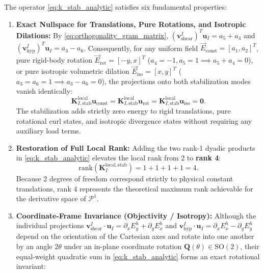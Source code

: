 \documentclass[VANCOUVER,Times1COL]{WileyNJD-v5}
\begin{document}
The operator \eqref{eq:k_stab_analytic} satisfies six fundamental properties:
\begin{enumerate}
    \item \textbf{Exact Nullspace for Translations, Pure Rotations, and Isotropic Dilations:} By \eqref{eq:orthogonality_gram_matrix}, $(\mathbf{v}_{\mathrm{shear}}^I)^T \mathbf{u}_I = a_5 + a_4$ and $(\mathbf{v}_{\mathrm{hyp}}^I)^T \mathbf{u}_I = a_3 - a_6$. Consequently, for any uniform field $\vec{E}_{\mathrm{const}} = [a_1, a_2]^T$, pure rigid-body rotation $\vec{E}_{\mathrm{rot}} = [-y, x]^T$ ($a_4 = -1, a_5 = 1 \implies a_5 + a_4 = 0$), or pure isotropic volumetric dilation $\vec{E}_{\mathrm{iso}} = [x, y]^T$ ($a_3 = a_6 = 1 \implies a_3 - a_6 = 0$), the projections onto both stabilization modes vanish identically:
          \begin{equation}
              \mathbf{K}_{I, \mathrm{stab}}^{\mathrm{local}} \mathbf{u}_{\mathrm{const}} = \mathbf{K}_{I, \mathrm{stab}}^{\mathrm{local}} \mathbf{u}_{\mathrm{rot}} = \mathbf{K}_{I, \mathrm{stab}}^{\mathrm{local}} \mathbf{u}_{\mathrm{iso}} = \mathbf{0}.
          \end{equation}
          The stabilization adds strictly zero energy to rigid translations, pure rotational curl states, and isotropic divergence states without requiring any auxiliary load terms.
    \item \textbf{Restoration of Full Local Rank:} Adding the two rank-1 dyadic products in \eqref{eq:k_stab_analytic} elevates the local rank from 2 to \textbf{rank 4}:
          \begin{equation}
              \mathrm{rank}\left(\mathbf{K}_I^{\mathrm{local, stab}}\right) = 1 + 1 + 1 + 1 = 4.
          \end{equation}
          Because 2 degrees of freedom correspond strictly to physical constant translations, rank 4 represents the theoretical maximum rank achievable for the derivative space of $\mathcal{P}^1$.
    \item \textbf{Coordinate-Frame Invariance (Objectivity / Isotropy):} Although the individual projections $\mathbf{v}_{\mathrm{shear}}^I \cdot \mathbf{u}_I = \partial_x E_y^h + \partial_y E_x^h$ and $\mathbf{v}_{\mathrm{hyp}}^I \cdot \mathbf{u}_I = \partial_x E_x^h - \partial_y E_y^h$ depend on the orientation of the Cartesian axes and rotate into one another by an angle $2\theta$ under an in-plane coordinate rotation $\mathbf{Q}(\theta) \in \mathrm{SO}(2)$, their equal-weight quadratic sum in \eqref{eq:k_stab_analytic} forms an exact rotational invariant:

\end{enumerate}
\end{document}
